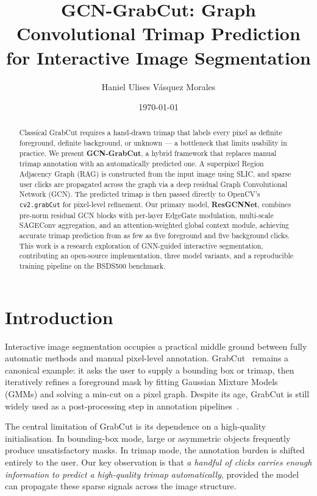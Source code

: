 \documentclass[11pt]{article}
\title{\textbf{GCN-GrabCut: Graph Convolutional Trimap Prediction\\
       for Interactive Image Segmentation}}
\author{Haniel Ulises V\'asquez Morales}
\date{\today}
\begin{document}
\maketitle

\begin{abstract}
Classical GrabCut requires a hand-drawn trimap that labels every pixel as definite foreground,
definite background, or unknown — a bottleneck that limits usability in practice.
We present \textbf{GCN-GrabCut}, a hybrid framework that replaces manual trimap annotation
with an automatically predicted one.
A superpixel Region Adjacency Graph (RAG) is constructed from the input image using SLIC,
and sparse user clicks are propagated across the graph via a deep residual Graph Convolutional
Network (GCN).
The predicted trimap is then passed directly to OpenCV's \texttt{cv2.grabCut} for pixel-level
refinement.
Our primary model, \textbf{ResGCNNet}, combines pre-norm residual GCN blocks with per-layer
EdgeGate modulation, multi-scale SAGEConv aggregation, and an attention-weighted global context
module, achieving accurate trimap prediction from as few as five foreground and five background
clicks.
This work is a research exploration of GNN-guided interactive segmentation, contributing
an open-source implementation, three model variants, and a reproducible training pipeline
on the BSDS500 benchmark.
\end{abstract}

\tableofcontents
\vspace{1em}

\section{Introduction}

Interactive image segmentation occupies a practical middle ground between fully automatic
methods and manual pixel-level annotation.
GrabCut~\cite{rother2004grabcut} remains a canonical example: it asks the user to supply a
bounding box or trimap, then iteratively refines a foreground mask by fitting Gaussian Mixture
Models (GMMs) and solving a min-cut on a pixel graph.
Despite its age, GrabCut is still widely used as a post-processing step in annotation
pipelines~\cite{boykov2001fast}.

The central limitation of GrabCut is its dependence on a high-quality initialisation.
In bounding-box mode, large or asymmetric objects frequently produce unsatisfactory masks.
In trimap mode, the annotation burden is shifted entirely to the user.
Our key observation is that \emph{a handful of clicks carries enough information to predict a
high-quality trimap automatically}, provided the model can propagate these sparse signals
across the image structure.
\end{document}
